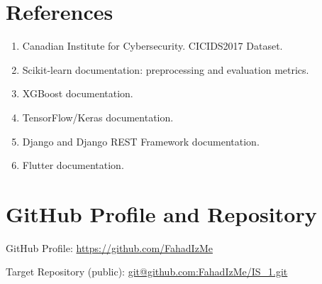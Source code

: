 \documentclass[12pt,a4paper]{article}
\begin{document}
\section{References}
\begin{enumerate}
\item Canadian Institute for Cybersecurity. CICIDS2017 Dataset.
\item Scikit-learn documentation: preprocessing and evaluation metrics.
\item XGBoost documentation.
\item TensorFlow/Keras documentation.
\item Django and Django REST Framework documentation.
\item Flutter documentation.
\end{enumerate}

\section*{GitHub Profile and Repository}
GitHub Profile: \url{https://github.com/FahadIzMe}

Target Repository (public): \url{git@github.com:FahadIzMe/IS_1.git}
\end{document}
